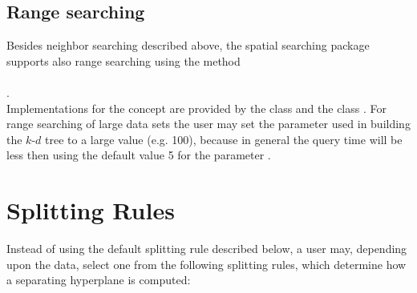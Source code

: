 \subsection{Range searching}

Besides neighbor searching described above, the spatial searching package
supports also range searching using the method \\
 \\
.\\
Implementations for the concept  are provided by
the class   
and the class . 
For range searching of large data sets the user may set the parameter  
used in building the $k$-$d$ tree to a large value (e.g. 100), 
because in general the query time will be less then using the default value 5 for the parameter .


\section{Splitting Rules}
\label{Spatial_Searching:Splitting_rule_section}

Instead of using the default splitting rule  described below,
a user may, depending upon the data, select 
one from the following splitting rules,
which determine how a separating hyperplane is computed:

